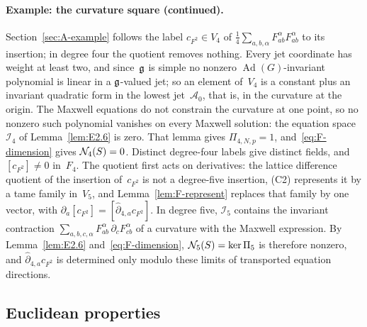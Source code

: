 \paragraph{Example: the curvature square (continued).} Section~\ref{sec:A-example} follows the label $c_{F^2}\in V_4$ of $\frac14\sum_{a,b,\alpha}F^\alpha_{ab}F^\alpha_{ab}$ to its insertion; in degree four the quotient removes nothing. Every jet coordinate has weight at least two, and since~$\mathfrak{g}$ is simple no nonzero $\operatorname{Ad}(G)$-invariant polynomial is linear in a $\mathfrak{g}$-valued jet; so an element of~$V_4$ is a constant plus an invariant quadratic form in the lowest jet~$\mathcal A_0$, that is, in the curvature at the origin. The Maxwell equations do not constrain the curvature at one point, so no nonzero such polynomial vanishes on every Maxwell solution: the equation space~$\mathcal I_4$ of Lemma~\ref{lem:E2.6} is zero. That lemma gives $\Pi_{4,N,p}=1$, and~\eqref{eq:F-dimension} gives $\mathcal{N}_{4}(S)=0$. Distinct degree-four labels give distinct fields, and $[c_{F^2}]\ne0$ in~$F_4$. The quotient first acts on derivatives: the lattice difference quotient of the insertion of~$c_{F^2}$ is not a degree-five insertion, (C2) represents it by a tame family in~$V_5$, and Lemma~\ref{lem:F-represent} replaces that family by one vector, with $\partial_a[c_{F^2}]=[\hat\partial_{4,a}c_{F^2}]$. In degree five, $\mathcal I_5$ contains the invariant contraction $\sum_{a,b,c,\alpha}F^\alpha_{ab}\,\partial_cF^\alpha_{cb}$ of a curvature with the Maxwell expression. By Lemma~\ref{lem:E2.6} and~\eqref{eq:F-dimension}, $\mathcal{N}_{5}(S)=\ker\Pi_5$ is therefore nonzero, and $\hat\partial_{4,a}c_{F^2}$ is determined only modulo these limits of transported equation directions.

\subsection{Euclidean properties}\label{sec:partII-F.4}


